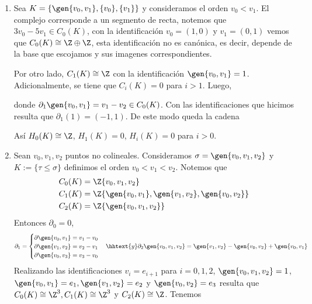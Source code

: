 \documentclass{article}
\begin{document}
\begin{enumerate}
    \item Sea $K=\{\gen{v_{0},v_{1}},\{v_{0}\},\{v_{1}\}\}$ y consideramos el 
    orden $v_{0}<v_{1}$. El complejo corresponde a un segmento de recta, notemos que 
    $3v_{0}-5v_{1}\in C_{0}(K)$, con la identificación $v_{0}=(1,0)$ y $v_{1}=(0,1)$ vemos que 
    $C_{0}(K)\cong\Z\oplus\Z$, esta identificación no es canónica, es decir, depende de la base 
    que escojamos y sus imagenes correspondientes.

    \vspace{2mm}
    \noindent Por otro lado, $C_{1}(K)\cong\Z$ con la identificación $\gen{v_{0},v_{1}}=1$. 
    Adicionalmente, se tiene que $C_{i}(K)=0$ para $i>1$. Luego,

    \vspace{2mm}
    \centerline{
    }
    \vspace{2mm}
    \noindent donde $\partial_{1}\gen{v_{0},v_{1}}=v_{1}-v_{2}\in C_{0}(K)$. Con las 
    identificaciones que hicimos resulta que $\partial_{1}(1)=(-1,1)$. De este modo queda la 
    cadena

    \vspace{2mm}
    \centerline{
    }
    \vspace{2mm}
    \noindent Así $H_{0}(K)\cong\Z$, $H_{1}(K)=0$, $H_{i}(K)=0$ para $i>0$.

    \item Sean $v_{0},v_{1},v_{2}$ puntos no colineales. Consideramos $\sigma=\gen
    {v_{0},v_{1},v_{2}}$ y $K:=\{\tau\leq\sigma\}$ definimos el orden $v_{0}<v_{1}<v_{2}$. Notemos
    que
    \begin{align*}
        C_{0}(K) &= \Z\{v_{0},v_{1},v_{2}\} \\
        C_{1}(K) &= \Z\{\gen{v_{0},v_{1}},\gen{v_{1},v_{2}},\gen{v_{0},v_{2}}\} \\
        C_{2}(K) &= \Z\{\gen{v_{0},v_{1},v_{2}}\}
    \end{align*}
    Entonces $\partial_{0}=0$,
    \begin{equation*}
        \partial_{1}=\begin{cases}
            \partial\gen{v_{0},v_{1}}=v_{1}-v_{0} \\
            \partial\gen{v_{1},v_{2}}=v_{2}-v_{1} \\
            \partial\gen{v_{0},v_{3}}=v_{3}-v_{0}
        \end{cases}\hhtext{y}
        \partial_{2}\gen{v_{0},v_{1},v_{2}}=\gen{v_{1},v_{2}}-\gen{v_{0},v_{2}}+\gen{v_{0},v_{1}}
    \end{equation*}
    Realizando las identificaciones $v_{i}=e_{i+1}$ para $i=0,1,2$, $\gen{v_{0},v_{1},v_{2}}=1$,
    $\gen{v_{0},v_{1}}=e_{1},\gen{v_{1},v_{2}}=e_{2}$ y $\gen{v_{0},v_{2}}=e_{3}$ resulta que
    $C_{0}(K)\cong\Z^{3},C_{1}(K)\cong\Z^{3}$ y $C_{2}(K)\cong\Z$. Tenemos
    

\end{enumerate}
\end{document}
